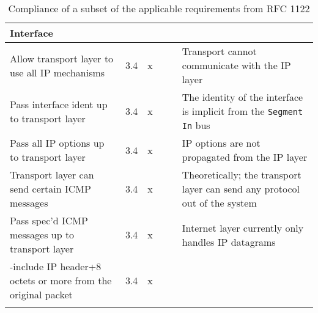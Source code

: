 \begin{longtable}{ | p{} | p{} | p{} |  p{} | p{} | p{} |}
\textbf{Interface} \\ \hline
  Allow transport layer to use all IP mechanisms &3.4     &x& & \cellcolor{red!25 } & Transport cannot communicate with the IP layer  \\ \hline
  Pass interface ident up to transport layer     &3.4     &x& & \cellcolor{yellow!25 } & The identity of the interface is implicit from the \texttt{Segment In} bus \\ \hline
  Pass all IP options up to transport layer      &3.4     &x& & \cellcolor{red!25 } & IP options are not propagated from the IP layer\\ \hline
  Transport layer can send certain ICMP messages &3.4     &x& & \cellcolor{yellow!25 } & Theoretically; the transport layer can send any protocol out of the system\\ \hline
  Pass spec'd ICMP messages up to transport layer  &3.4     &x& & \cellcolor{red!25 }& Internet layer currently only handles IP datagrams \\ \hline
   -include IP header+8 octets or more from the original packet  &3.4     &x& & \cellcolor{red!25 } & \\ \hline
\hline
\caption{Compliance of a subset of the applicable requirements from RFC 1122}
\label{tab:rfc_compliance}
\end{longtable}


